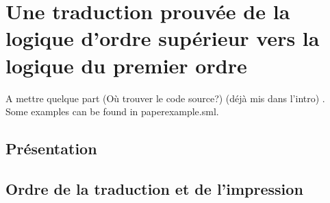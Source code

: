\section{Une traduction prouvée de la logique d'ordre supérieur vers la
  logique du premier ordre}
\label{sec:traduction}
 
A mettre quelque part (Où trouver le code source?) (déjà mis dans l'intro)
. Some examples can be found in paperexample.sml.

\subsection{Présentation}

\subsection{Ordre de la traduction et de l'impression}

